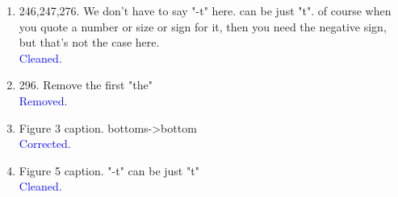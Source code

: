 \documentclass[a4paper,11pt,twoside]{article}
\begin{document}
\begin{enumerate}
   \item 246,247,276.  We don't have to say "-t" here.  can be just "t".  of 
      course when you quote a number or size or sign for it, then you need the 
      negative sign, but that's not the case here.\\
      \textcolor{blue}{Cleaned. }

   \item 296.  Remove the first "the"\\
      \textcolor{blue}{Removed. }

   \item Figure 3 caption.  bottoms->bottom\\
      \textcolor{blue}{Corrected. }

   \item Figure 5 caption. "-t" can be just "t"\\
      \textcolor{blue}{Cleaned.}

\end{enumerate}
\end{document}
